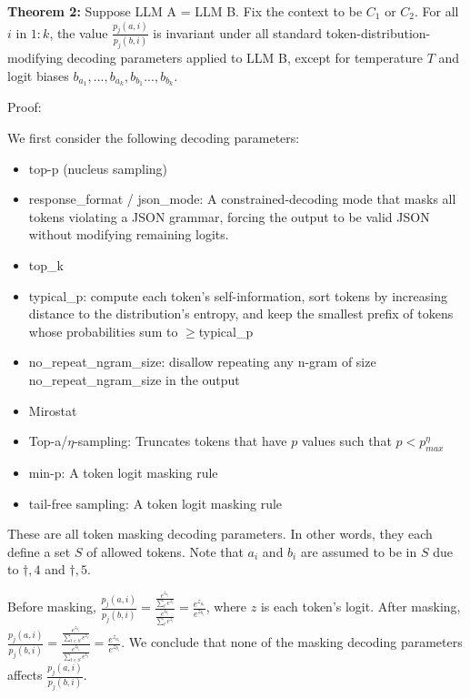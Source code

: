 \documentclass{article}
\begin{document}
\textbf{Theorem 2:} Suppose LLM A = LLM B. Fix the context to be $\displaystyle C_{1}$ or $\displaystyle C_{2}$. For all $\displaystyle i$ in $\displaystyle 1:k$, the value $\displaystyle \frac{p_{j}( a,i)}{p_{j}( b,i)}$ is invariant under all standard token-distribution-modifying decoding parameters applied to LLM B, except for temperature $\displaystyle T$ and logit biases $\displaystyle b_{a_{1}} ,...,b_{a_{k}} ,b_{b_{1}} ...,b_{b_{k}}$.



Proof:

We first consider the following decoding parameters:
\begin{itemize}
\item top-p (nucleus sampling)
\item response\_format / json\_mode: A constrained-decoding mode that masks all tokens violating a JSON grammar, forcing the output to be valid JSON without modifying remaining logits.
\item top\_k
\item typical\_p: compute each token's self-information, sort tokens by increasing distance to the distribution's entropy, and keep the smallest prefix of tokens whose probabilities sum to $\displaystyle \geqslant $typical\_p
\item no\_repeat\_ngram\_size: disallow repeating any n-gram of size no\_repeat\_ngram\_size in the output
\item Mirostat
\item Top-a/$\displaystyle \eta $-sampling: Truncates tokens that have $\displaystyle p$ values such that $\displaystyle p< p_{max}^{\eta }$
\item min-p: A token logit masking rule
\item tail-free sampling: A token logit masking rule
\end{itemize}

These are all token masking decoding parameters. In other words, they each define a set $\displaystyle S$ of allowed tokens. Note that $\displaystyle a_{i}$ and $\displaystyle b_{i}$ are assumed to be in $\displaystyle S$ due to $\displaystyle \dagger ,4$ and $\displaystyle \dagger ,5$. 

Before masking, $\displaystyle \frac{p_{j}( a,i)}{p_{j}( b,i)} =\frac{\frac{e^{z_{a_{i}}}}{\sum _{t} e^{z_{t}}}}{\frac{e^{z_{b_{i}}}}{\sum _{t} e^{z_{t}}}} =\frac{e^{z_{a_{i}}}}{e^{z_{b_{i}}}}$, where $\displaystyle z$ is each token's logit. After masking, $\displaystyle \frac{p_{j}( a,i)}{p_{j}( b,i)} =\frac{\frac{e^{z_{a_{i}}}}{\sum _{t\in S} e^{z_{t}}}}{\frac{e^{z_{b_{i}}}}{\sum _{t\in S} e^{z_{t}}}} =\frac{e^{z_{a_{i}}}}{e^{z_{b_{i}}}}$. We conclude that none of the masking decoding parameters affects $\displaystyle \frac{p_{j}\left( a,i\right)}{p_{j}\left( b,i\right)}$.
\end{document}
